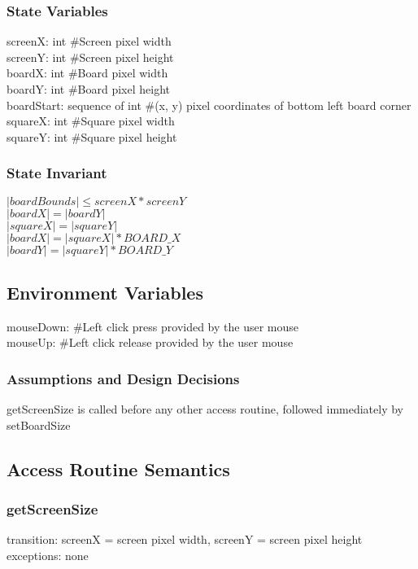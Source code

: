 \documentclass{article}
\begin{document}
        \subsubsection*{State Variables}
            screenX: int \#Screen pixel width\\
            screenY: int \#Screen pixel height\\
            boardX: int \#Board pixel width\\
            boardY: int \#Board pixel height\\
            boardStart: sequence of int \#(x, y) pixel coordinates of bottom left board corner\\
            squareX: int \#Square pixel width\\
            squareY: int \#Square pixel height
            
        \subsubsection*{State Invariant}
            $|boardBounds| \leq screenX*screenY$ \\
            $|boardX| = |boardY|$ \\
            $|squareX| = |squareY|$ \\
            $|boardX| = |squareX| * BOARD\_X$ \\
            $|boardY| = |squareY| * BOARD\_Y$ \\
            
    \subsection*{Environment Variables}
        mouseDown: \#Left click press provided by the user mouse\\
        mouseUp: \#Left click release provided by the user mouse\\
        
        \subsubsection*{Assumptions and Design Decisions}
            getScreenSize is called before any other access routine, followed immediately by setBoardSize
            
    \subsection*{Access Routine Semantics}
        \subsubsection*{getScreenSize} 
            transition: screenX = screen pixel width, screenY = screen pixel height \\
            exceptions: none
        
\end{document}
